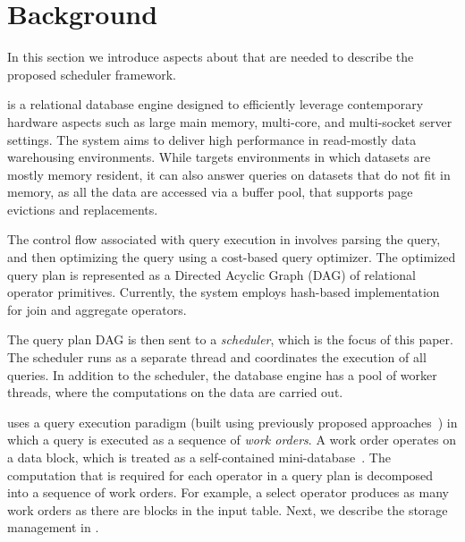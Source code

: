 \section{Background}\label{sec:background}
In this section we introduce aspects about \sys{} that are needed to 
describe the proposed scheduler framework.

\sys{} is a relational database engine 
designed to efficiently leverage contemporary hardware aspects such as large main memory, multi-core, and multi-socket server settings. 
The system aims to deliver high performance in read-mostly data warehousing 
environments.  
While \sys{} targets environments in which datasets are mostly memory resident, it can also answer queries on datasets that do not fit in memory, as all the data are accessed via a buffer pool, that supports page evictions and replacements. 

The control flow associated with query execution in \sys{} involves 
parsing the query, and then optimizing the query using a cost-based query 
optimizer.
The optimized query plan is represented as a Directed Acyclic 
Graph (DAG) of relational operator primitives. 
Currently, the system employs hash-based implementation for join and aggregate operators. 

The query plan DAG is then sent to a \textit{scheduler}, which is the focus of this paper. 
The scheduler runs as a separate thread and coordinates the execution of all queries. 
In addition to the scheduler, the database engine has a pool of worker 
threads, where the computations on the data are carried out. 

\sys{} uses a query execution paradigm (built using previously proposed approaches~\cite{qsstorage,morsel}) in which a query is executed as a sequence of \textit{work orders}. 
A work order operates on a data block, which is treated as a self-contained mini-database~\cite{qsstorage}. 
The computation that is required for each operator in a query plan is decomposed into a sequence of work orders. 
For example, a select operator produces as many work orders as there are blocks in the input table. 
Next, we describe the storage management in \sys{}.

